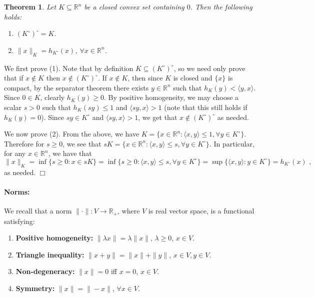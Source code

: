 \documentclass[11pt]{article}
\newtheorem{theorem}{Theorem}
\theoremstyle{plain}
\newenvironment{proof}{\noindent {\sc Proof:}}{$\Box$ \medskip}
\theoremstyle{plain}
\newcommand{\set}[1]{\{{#1}\}}
\newcommand{\R}{\ensuremath{\mathbb{R}}}
\newcommand{\pr}[2]{\langle{#1, #2}\rangle}
\begin{document}
\begin{theorem} Let $K \subseteq \R^n$ be a closed convex set containing $0$.
Then the following holds:
\begin{enumerate}
\item $(K^\circ)^\circ = K$. 
\item $\|x\|_K = h_{K^\circ}(x)$, $\forall x \in \R^n$. 
\end{enumerate}
\label{thm:func-dual}
\end{theorem}
\begin{proof}
We first prove (1). Note that by definition $K \subseteq (K^{\circ})^\circ$, so
we need only prove that if $x \notin K$ then $x \notin (K^{\circ})^\circ$. If $x
\notin K$, then since $K$ is closed and $\set{x}$ is compact, by the separator
theorem there exists $y \in \R^n$ such that $h_K(y) < \pr{y}{x}$. Since $0 \in
K$, clearly $h_K(y) \geq 0$. By positive homogeneity, we may choose a scalar $s
> 0$ such that $h_K(s y) \leq 1$ and $\pr{sy}{x} > 1$ (note that this still
holds if $h_K(y) = 0$). Since $sy \in K^\circ$ and
$\pr{sy}{x} > 1$, we get that $x \notin (K^\circ)^\circ$ as needed.

We now prove (2). From the above, we have $K = \set{x \in \R^n: \pr{x}{y} \leq
1, \forall y \in K^\circ}$. Therefore for $s \geq 0$, we see that $sK = \set{x
\in \R^n: \pr{x}{y} \leq s, \forall y \in K^\circ}$. In particular, for any $x
\in \R^n$, we have that
\[
\|x\|_K = \inf \set{s \geq 0: x \in sK} = \inf \set{s \geq 0: \pr{x}{y} \leq s,
\forall y \in K^\circ} = \sup \set{\pr{x}{y}: y \in K^\circ} = h_{K^\circ}(x) \text{ ,}
\]
as needed.
\end{proof}

\paragraph{\bf Norms:} We recall that a norm $\|\cdot\|: V \rightarrow \R_+$,
where $V$ is real vector space, is a functional satisfying:

\begin{enumerate}
\item {\bf Positive homogeneity:} $\|\lambda x\| = \lambda \|x\|$, $\lambda \geq
0$, $x \in V$.  
\item {\bf Triangle inequality:} $\|x + y\| = \|x\| + \|y\|$, $x \in V, y \in
V$.  
\item {\bf Non-degeneracy:} $\|x\| = 0$ iff $x = 0$, $x \in V$.
\item {\bf Symmetry:} $\|x\| = \|-x\|$, $\forall x \in V$.
\end{enumerate}
\end{document}
